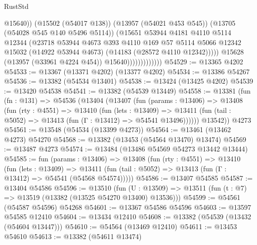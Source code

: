 \begin{lexlean}{RustStd}
\begin{coremodule}
                                    @15640))
                                (@15502 (@54017 @138))
                                (@13957 (@54021 @453 @545))
                                (@13705 (@54028 @545 @140 @5496 @5114))
                                (@15651
                                  @53944
                                  @4181
                                  @4110
                                  @5114
                                  @12344
                                  (@23718
                                    @53944
                                    @4673
                                    @393
                                    @4110
                                    @169
                                    @57
                                    @5114
                                    @5066
                                    @12342
                                    @15032
                                    (@14922 @53944 @4673)
                                    (@14183 (@28572 @4110 @12342)))))
                              @15628
                              (@13957 (@33961 @4224 @454))
                              @15640)))))))))))))
@54529 := @13365 @4202
@54533 := @13367 (@13371 @4202) (@13377 @4202)
@54534 := @13386 @54267
@54536 := @13382 (@54534 @13401)
@54538 := @13424 (@13425 @4202)
@54539 := @13420 @54538
@54541 := @13382 (@54539 @13449)
@54558 := @13381
    (fun (fn : @131) =>
    @54536
      (@13404
        (@13407
          (fun (params : @13406) =>
          @13408
            (fun (rty : @4551) =>
            @13410
              (fun (lets : @13409) =>
              @13411 (fun (tail : @5052) => @13413 (fun (Γ : @13412) => @54541 @13496))))))
        @13542))
    @4273
@54561 := @13548 (@54534 (@13399 @4273))
@54564 := @13461 (@13462 @4273) @54270
@54568 := @13382 (@13453 (@54564 @13470) @13474)
@54569 := @13487 @4273
@54574 := @13484 (@13486 @54569 @54273 @13442 @13444)
@54585 := fun (params : @13406) =>
  @13408
    (fun (rty : @4551) =>
    @13410
      (fun (lets : @13409) =>
      @13411 (fun (tail : @5052) => @13413 (fun (Γ : @13412) => @54541 (@54568 @54574)))))
@54586 := @13407 @54585
@54587 := @13404 @54586
@54596 := @13510
    (fun (U : @13509) => @13511 (fun (t : @7) => @13519 (@13382 (@13525 @54270 @13400) @13536)))
@54599 := @54561 (@54587 @54596) @54268
@54601 := @13367 @54586 @54596
@54603 := @13597 @54585 @12410
@54604 := @13434 @12410
@54608 := @13382 (@54539 (@13432 (@54604 @13447)))
@54610 := @54564 (@13469 @12410)
@54611 := @13453 @54610
@54613 := @13382 (@54611 @13474)

\end{coremodule}
\end{lexlean}
